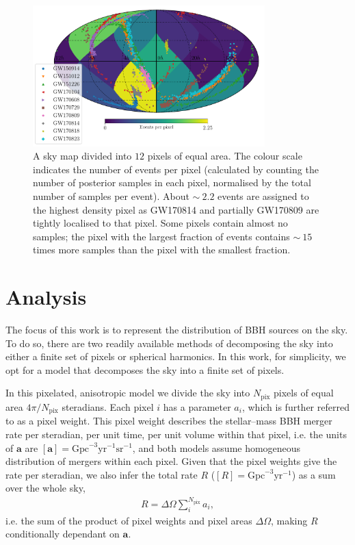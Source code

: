 \documentclass[usenatbib,useAMS]{mnras}
\newcommand{\Npix}{\ensuremath{N_\mathrm{pix}}}
\begin{document}
% 
\begin{figure}
    \centering
    \includegraphics[width=0.8\textwidth]{./figures/events_per_pixel.pdf}
    \caption{
    A sky map divided into $12$ pixels of equal area. The colour scale indicates
    the number of events per pixel (calculated by counting the number of
    posterior samples in each pixel, normalised by the total number of samples
    per event). About $\sim~2.2$ events are assigned to the highest density
    pixel as GW170814 and partially GW170809 are tightly localised to that
    pixel. Some pixels contain almost no samples; the pixel with the largest
    fraction of events contains $\sim~15$ times more samples than the pixel with
    the smallest fraction.}
    \label{fig:eventLocalisation}
\end{figure}

% 
\section{Analysis}\label{sec:analysis}
The focus of this work is to represent the distribution of \ac{BBH} sources on
the sky. To do so, there are two readily available methods of decomposing the
sky into either a finite set of pixels or spherical harmonics. In this work, for
simplicity, we opt for a model that decomposes the sky into a finite set of
pixels.

In this pixelated, anisotropic model we divide the sky into $\Npix$ pixels of
equal area $4\pi / \Npix $ steradians. Each pixel $i$ has a parameter $a_i$,
which is further referred to as a pixel weight. This pixel weight describes the
stellar--mass \ac{BBH} merger rate per steradian, per unit time, per unit
volume within that pixel, i.e. the units of  $\bm{a}$ are 
$\left[\bm{a}\right] = \mathrm{Gpc}^{-3}\mathrm{yr}^{-1}\mathrm{sr}^{-1}$,
and both models assume homogeneous distribution of mergers within each pixel.
Given that the pixel weights give the rate per steradian, we also infer the
total rate $R$ ($\left[R\right] = \mathrm{Gpc}^{-3}\mathrm{yr}^{-1}$) as a
sum over the whole sky,
%
\begin{align}\label{eq:totalRate}
    R=\Delta\Omega \sum_{i}^{\Npix} a_i,
\end{align}
%
i.e. the sum of the product of pixel weights and pixel areas $\Delta\Omega$,
making $R$ conditionally dependant on $\bm{a}$.
\end{document}

